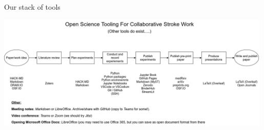 \documentclass[xcolor={usenames,dvipsnames}]{beamer}
\begin{document}

\begin{frame}{Our stack of tools}


\begin{center}
\includegraphics[width=0.99\textwidth]{./images/open_science_light}
\end{center}


\end{frame}
\end{document}
